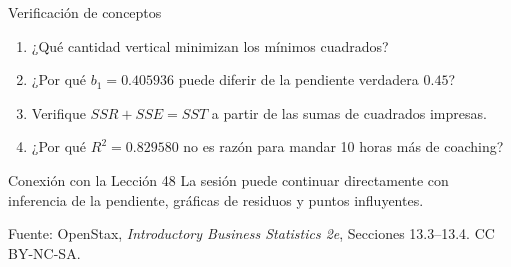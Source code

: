\documentclass[aspectratio=169,10pt,spanish]{beamer}
\begin{document}
\begin{frame}{Verificación de conceptos}
  \begin{enumerate}
    \item ¿Qué cantidad vertical minimizan los mínimos cuadrados?
    \item ¿Por qué $b_1=0.405936$ puede diferir de la pendiente verdadera
      $0.45$?
    \item Verifique $SSR+SSE=SST$ a partir de las sumas de cuadrados
      impresas.
    \item ¿Por qué $R^2=0.829580$ no es razón para mandar 10 horas más de
      coaching?
  \end{enumerate}

  \vspace{0.6em}
  \begin{block}{Conexión con la Lección 48}
    La sesión puede continuar directamente con inferencia de la pendiente,
    gráficas de residuos y puntos influyentes.
  \end{block}

  \vfill
  \scriptsize Fuente: OpenStax, \textit{Introductory Business Statistics 2e},
  Secciones 13.3--13.4. CC BY-NC-SA.
\end{frame}

\appendix
\end{document}
